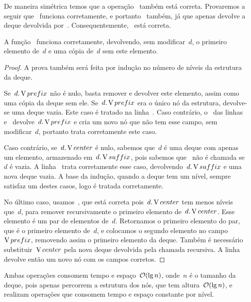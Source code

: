 \documentclass[main.tex]{subfiles}
\begin{document}
De maneira simétrica temos que a operação~ também está correta. Provaremos a seguir que~ funciona corretamente, e portanto~ também, já que apenas devolve a deque devolvida por~. Consequentemente,~ está correta.

\begin{proposition}
A função~ funciona corretamente, devolvendo, sem modificar~$d$, o primeiro elemento de~$d$ e uma cópia de~$d$ sem este elemento.
\end{proposition}

\begin{proof}
A prova também será feita por indução no número de níveis da estrutura da deque.

    Se~$d.\operatorname{V}{prefix}$ não é nulo, basta remover e devolver este elemento, assim como uma cópia da deque sem ele. Se~$d.\operatorname{V}{prefix}$ era o único nó da estrutura, devolve-se uma deque vazia. Este caso é tratado na linha~. Caso contrário, o~ das linhas~ e~ devolve~$d.\operatorname{V}{prefix}$ e cria um novo nó que não tem esse campo, sem modificar~$d$, portanto trata corretamente este caso.

Caso contrário, se~$d.\operatorname{V}{center}$ é nulo, sabemos que~$d$ é uma deque com apenas um elemento, armazenado em~$d.\operatorname{V}{suffix}$, pois sabemos que~ não é chamada se~$d$ é vazia. A linha~ trata corretamente esse caso, devolvendo~$d.\operatorname{V}{suffix}$ e uma nova deque vazia. A base da indução, quando a deque tem um nível, sempre satisfaz um destes casos, logo é tratada corretamente.

No último caso, usamos~, que está correta pois~$d.\operatorname{V}{center}$ tem menos níveis que~$d$, para remover recursivamente o primeiro elemento de~$d.\operatorname{V}{center}$. Esse elemento é um par de elementos de~$d$. Retornamos o primeiro elemento do par, que é o primeiro elemento de~$d$, e colocamos o segundo elemento no campo~$\operatorname{V}{prefix}$, removendo assim o primeiro elemento da deque. Também é necessário substituir~$\operatorname{V}{center}$ pela nova deque devolvida pela chamada recursiva. A linha~ devolve então um novo nó com os campos corretos.
\end{proof}

Ambas operações consomem tempo e espaço~$\mathcal{O}(\lg n)$, onde~$n$ é o tamanho da deque, pois apenas percorrem a estrutura dos nós, que tem altura~$\mathcal{O}(\lg n)$, e realizam operações que consomem tempo e espaço constante por nível.
\end{document}
